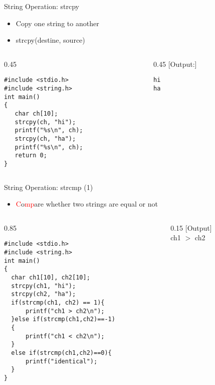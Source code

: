 \begin{frame}[fragile]{String Operation: strcpy}
\begin{itemize}
	\item {Copy one string to another}
	\item {strcpy(destine, source)}
\end{itemize}
\begin{columns}
\begin{column}{0.45\linewidth}
\begin{lstlisting}
#include <stdio.h>
#include <string.h>
int main()
{
   char ch[10];
   strcpy(ch, "hi");
   printf("%s\n", ch);
   strcpy(ch, "ha");
   printf("%s\n", ch);
   return 0;
}
\end{lstlisting}
\end{column}
\begin{column}{0.45\linewidth}
[Output:]
\begin{lstlisting}
hi
ha
\end{lstlisting}
\end{column}
\end{columns}
\end{frame}


\begin{frame}[fragile]{String Operation: strcmp (1)}
\begin{itemize}
	\item {\textcolor{red}{C}o\textcolor{red}{mp}are whether two strings are equal or not}
\end{itemize}
\begin{columns}
\begin{column}{0.85\linewidth}
\begin{lstlisting}[xleftmargin=0.05\linewidth, linewidth=0.94\linewidth]
#include <stdio.h>
#include <string.h>
int main()
{
  char ch1[10], ch2[10];
  strcpy(ch1, "hi");
  strcpy(ch2, "ha");
  if(strcmp(ch1, ch2) == 1){
      printf("ch1 > ch2\n");
  }else if(strcmp(ch1,ch2)==-1)
  {
      printf("ch1 < ch2\n");
  }
  else if(strcmp(ch1,ch2)==0){
      printf("identical");
  }
}
\end{lstlisting}
\end{column}
\begin{column}{0.15\linewidth}
[Output]\\
ch1 $>$ ch2
\end{column}
\end{columns}

\end{frame}


